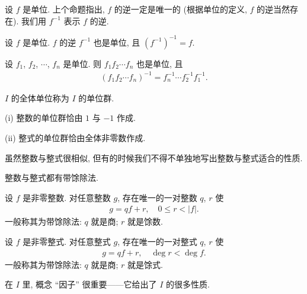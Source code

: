 \begin{definition}
    设 $f$ 是单位. 上个命题指出, $f$ 的逆一定是唯一的 (根据单位的定义, $f$ 的逆当然存在). 我们用 $f^{-1}$ 表示 $f$ 的逆.
\end{definition}

\begin{proposition}
    设 $f$ 是单位. $f$ 的逆 $f^{-1}$ 也是单位, 且 $(f^{-1})^{-1} = f$.
\end{proposition}

\begin{proposition}
    设 $f_1$, $f_2$, $\cdots$, $f_n$ 是单位. 则 $f_1 f_2 \cdots f_n$ 也是单位, 且
    \begin{align*}
        (f_1 f_2 \cdots f_n)^{-1} = f_n^{-1} \cdots f_2^{-1} f_1^{-1}.
    \end{align*}
\end{proposition}

\begin{definition}
    $I$ 的全体单位称为 $I$ 的单位群.
\end{definition}

\begin{proposition}
    (i) 整数的单位群恰由 $1$ 与 $-1$ 作成.

    (ii) 整式的单位群恰由全体非零数作成.
\end{proposition}

\begin{remark}
    虽然整数与整式很相似, 但有的时候我们不得不单独地写出整数与整式适合的性质.
\end{remark}

整数与整式都有带馀除法.

\begin{proposition}
    设 $f$ 是非零整数. 对任意整数 $g$, 存在唯一的一对整数 $q$, $r$ 使
    \begin{align*}
        g = qf + r, \quad 0 \leq r < |f|.
    \end{align*}
    一般称其为带馀除法: $q$ 就是商; $r$ 就是馀数.
\end{proposition}

\begin{proposition}
    设 $f$ 是非零整式. 对任意整式 $g$, 存在唯一的一对整式 $q$, $r$ 使
    \begin{align*}
        g = q f + r, \quad \deg r < \deg f.
    \end{align*}
    一般称其为带馀除法: $q$ 就是商; $r$ 就是馀式.
\end{proposition}

在 $I$ 里, 概念 ``因子'' 很重要——它给出了 $I$ 的很多性质.


